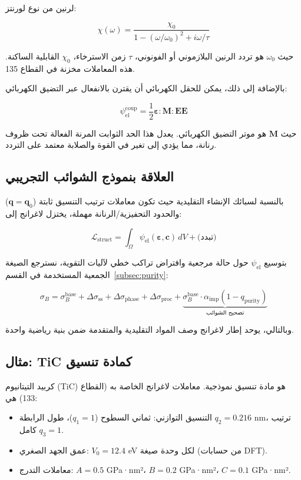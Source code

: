 \documentclass[11pt,a4paper]{article}
\begin{document}
\begin{otherlanguage}{arabic}
		لرنين من نوع لورنتز:
		
		\[
		\chi(\omega) = \frac{\chi_0}{1 - (\omega/\omega_0)^2 + i\omega/\tau}
		\]
		
		حيث \(\omega_0\) هو تردد الرنين البلازموني أو الفونوني، \(\tau\) زمن الاسترخاء، \(\chi_0\) القابلية الساكنة. هذه المعاملات مخزنة في القطاع 135.
		
		بالإضافة إلى ذلك، يمكن للحقل الكهربائي أن يقترن بالانفعال عبر التضيق الكهربائي:
		
		\[
		\psi_{\mathrm{el}}^{\mathrm{coup}} = \frac{1}{2} \boldsymbol{\varepsilon} : \mathbf{M} : \mathbf{E}\mathbf{E}
		\]
		
		حيث \(\mathbf{M}\) هو موتر التضيق الكهربائي. يعدل هذا الحد الثوابت المرنة الفعالة تحت ظروف رنانة، مما يؤدي إلى تغير في القوة والصلابة معتمد على التردد.
		
		\subsection{العلاقة بنموذج الشوائب التجريبي}
		\label{subsec:relation-empirical}
		
		بالنسبة لسبائك الإنشاء التقليدية حيث تكون معاملات ترتيب التنسيق ثابتة (\(\mathbf{q} = \mathbf{q}_0\)) والحدود التحفيزية/الرنانة مهملة، يختزل لاغرانج إلى:
		
		\[
		\mathcal{L}_{\mathrm{struct}} = \int_{\Omega} \psi_{\mathrm{el}}(\boldsymbol{\varepsilon}, \mathbf{c}) \, dV + \text{(تبدد)}
		\]
		
		بتوسيع \(\psi_{\mathrm{el}}\) حول حالة مرجعية وافتراض تراكب خطي لآليات التقوية، نسترجع الصيغة الجمعية المستخدمة في القسم~\ref{subsec:purity}:
		
		\[
		\sigma_B = \sigma_B^{\mathrm{base}} + \Delta\sigma_{\mathrm{ss}} + \Delta\sigma_{\mathrm{phase}} + \Delta\sigma_{\mathrm{proc}} + \underbrace{\sigma_B^{\mathrm{base}} \cdot \alpha_{\mathrm{imp}} (1 - q_{\mathrm{purity}})}_{\text{تصحيح الشوائب}}
		\]
		
		وبالتالي، يوحد إطار لاغرانج وصف المواد التقليدية والمتقدمة ضمن بنية رياضية واحدة.
		
		\subsection{مثال: TiC كمادة تنسيق}
		\label{subsec:example-tic}
		
		كربيد التيتانيوم (TiC) هو مادة تنسيق نموذجية. معاملات لاغرانج الخاصة به (القطاع 133) هي:
		
		\begin{itemize}
			\item التنسيق التوازني: ثماني السطوح (\(q_1=1\))، طول الرابطة \(q_2 = 0.216\) nm، ترتيب كامل \(q_3=1\).
			\item عمق الجهد الصغري: \(V_0 = 12.4\) eV لكل وحدة صيغة (من حسابات DFT).
			\item معاملات التدرج: \(A=0.5\) GPa·nm²، \(B=0.2\) GPa·nm²، \(C=0.1\) GPa·nm².
		\end{itemize}
		

\end{otherlanguage}
\end{document}
